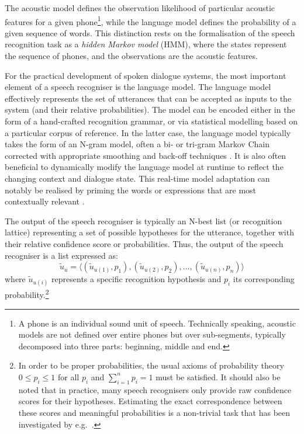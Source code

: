 The acoustic model defines the observation likelihood of particular acoustic features for a given phone\footnote{A phone is an individual sound unit of speech.  Technically speaking, acoustic models are not defined over entire phones but over sub-segments, typically decomposed into three parts: beginning, middle and end.}, while the language model defines the probability of a given sequence of words. This distinction rests on the formalisation of the speech recognition task as a \textit{hidden Markov model} (HMM), where the states represent the sequence of phones, and the observations are the acoustic features.  


For the practical development of spoken dialogue systems, the most important element of a speech recogniser is the language model.  The language model effectively represents the set of utterances that can be accepted as inputs to the system (and their relative probabilities).  The model can be encoded either in the form of a hand-crafted recognition grammar, or via statistical modelling based on a particular corpus of reference.  In the latter case, the language model typically takes the form of an N-gram model, often a bi- or tri-gram Markov Chain corrected with appropriate smoothing and back-off techniques  \citep{Jelinek:1998,ChenG99}.  It is also often beneficial to dynamically modify the language model at runtime to reflect the changing context and dialogue state.  This real-time model adaptation can notably be realised by priming the words or expressions that are most contextually relevant \citep{gruenstein2005context,ESSLLI2008-springerreprint}.

The output of the speech recogniser is typically an N-best list (or recognition lattice) representing a set of possible hypotheses for the utterance, together with their relative confidence score or probabilities.  Thus, the output of the speech recogniser is a list expressed as: 
\begin{equation*}
\tilde{u}_u = \langle (\tilde{u}_{u(1)}, p_{1}), (\tilde{u}_{u(2)}, p_{2}), \dots, (\tilde{u}_{u(n)}, p_{n})\rangle
\end{equation*}
where $\tilde{u}_{u(i)}$ represents a specific recognition hypothesis and $p_{i}$ its corresponding probability.\footnote{In order to be proper probabilities,  the usual axioms of probability theory $0 \leq p_{i} \leq 1$ for all $p_{i}$ and $\sum_{i=1}^n p_{i} = 1$ must be satisfied.   It should also be noted that in practice, many speech recognisers only provide raw confidence scores for their hypotheses.  Estimating the exact correspondence between these scores and meaningful probabilities is a non-trivial task that has been investigated by e.g.\ \cite{Williams08}.} 

